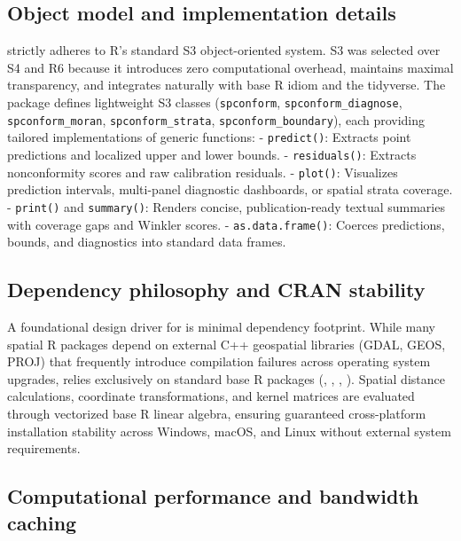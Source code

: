 \subsection{Object model and implementation details}\label{object-model-and-implementation-details}

 strictly adheres to R's standard S3 object-oriented system. S3 was selected over S4 and R6 because it introduces zero computational overhead, maintains maximal transparency, and integrates naturally with base R idiom and the tidyverse. The package defines lightweight S3 classes (\texttt{spconform}, \texttt{spconform\_diagnose}, \texttt{spconform\_moran}, \texttt{spconform\_strata}, \texttt{spconform\_boundary}), each providing tailored implementations of generic functions:
- \texttt{predict()}: Extracts point predictions and localized upper and lower bounds.
- \texttt{residuals()}: Extracts nonconformity scores and raw calibration residuals.
- \texttt{plot()}: Visualizes prediction intervals, multi-panel diagnostic dashboards, or spatial strata coverage.
- \texttt{print()} and \texttt{summary()}: Renders concise, publication-ready textual summaries with coverage gaps and Winkler scores.
- \texttt{as.data.frame()}: Coerces predictions, bounds, and diagnostics into standard data frames.

\subsection{Dependency philosophy and CRAN stability}\label{dependency-philosophy-and-cran-stability}

A foundational design driver for  is minimal dependency footprint. While many spatial R packages depend on external C++ geospatial libraries (GDAL, GEOS, PROJ) that frequently introduce compilation failures across operating system upgrades,  relies exclusively on standard base R packages (, , , ). Spatial distance calculations, coordinate transformations, and kernel matrices are evaluated through vectorized base R linear algebra, ensuring guaranteed cross-platform installation stability across Windows, macOS, and Linux without external system requirements.

\subsection{Computational performance and bandwidth caching}\label{computational-performance-and-bandwidth-caching}


